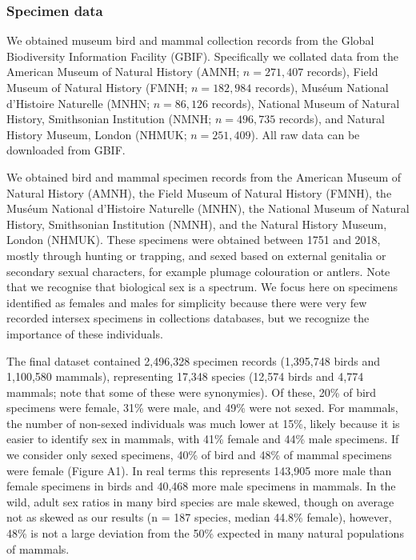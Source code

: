 \documentclass[a4paper, 12pt]{article}
\begin{document}
\subsubsection{Specimen data} 
We obtained museum bird and mammal collection records from the Global Biodiversity Information Facility (GBIF\cite{gbif}). 
Specifically we collated data from the American Museum of Natural History (AMNH; $n = 271,407$ records\cite{amnh-birds,amnh-mammals}), Field Museum of Natural History (FMNH; $n = 182,984$ records\cite{fmnh-birds,fmnh-mammals}), Mus\'{e}um National d'Histoire Naturelle (MNHN; $n = 86,126$ records\cite{mnhn-birds,mnhn-mammals}), National Museum of Natural History, Smithsonian Institution (NMNH; $n = 496,735$ records\cite{smithsonian-both}), and Natural History Museum, London (NHMUK; $n = 251,409$\cite{nhm-all}).
 All raw data can be downloaded from GBIF\cite{gbif}.

We obtained bird and mammal specimen records from the American Museum of Natural History (AMNH), the Field Museum of Natural History (FMNH), the Mus\'{e}um National d'Histoire Naturelle (MNHN), the National Museum of Natural History, Smithsonian Institution (NMNH), and the Natural History Museum, London (NHMUK). 
These specimens were obtained between 1751 and 2018, mostly through hunting or trapping, and sexed based on external genitalia or secondary sexual characters, for example plumage colouration or antlers. 
Note that we recognise that biological sex is a spectrum\cite{sciam2017}. 
We focus here on specimens identified as females and males for simplicity because there were very few recorded intersex specimens in collections databases, but we recognize the importance of these individuals.

The final dataset contained 2,496,328 specimen records (1,395,748 birds and 1,100,580 mammals), representing 17,348 species (12,574 birds and 4,774 mammals; note that some of these were synonymies). 
Of these, 20\% of bird specimens were female, 31\% were male, and 49\% were not sexed. 
For mammals, the number of non-sexed individuals was much lower at 15\%, likely because it is easier to identify sex in mammals, with 41\% female and 44\% male specimens. 
If we consider only sexed specimens, 40\% of bird and 48\% of mammal specimens were female (Figure A1). 
In real terms this represents 143,905 more male than female specimens in birds and 40,468 more male specimens in mammals. 
In the wild, adult sex ratios in many bird species are male skewed, though on average not as skewed as our results (n = 187 species, median 44.8\% female\cite{szekely2014sex}), however, 48\% is not a large deviation from the 50\% expected in many natural populations of mammals\cite{karlin1986theoretical}.
\end{document}
